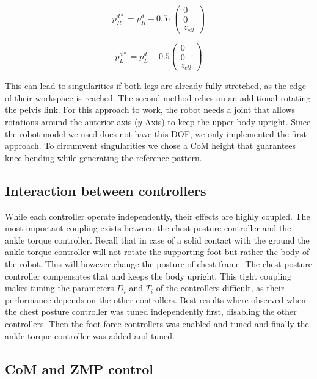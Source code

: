 \documentclass[english,ngerman]{KITreprt}
\begin{document}
\begin{equation}
p^{d*}_R = p^d_R + 0.5 \cdot \left(\begin{array}{c}0 \\ 0 \\ z_{ctl} \end{array}\right)
\end{equation}

\begin{equation}
p^{d*}_L = p^d_L - 0.5 \left(\begin{array}{c}0 \\ 0 \\ z_{ctl} \end{array}\right)
\end{equation}

This can lead to singularities if both legs are already fully stretched,
as the edge of their workspace is reached. The second method relies on
an additional rotating the pelvis link. For this approach to work, the
robot needs a joint that allows rotations around the anterior axis
($y$-Axis) to keep the upper body upright. Since the robot model we used
does not have this DOF, we only implemented the first approach. To
circumvent singularities we chose a CoM height that guarantees knee
bending while generating the reference pattern.

\subsection{Interaction between
controllers}\label{interaction-between-controllers}

While each controller operate independently, their effects are highly
coupled. The most important coupling exists between the chest posture
controller and the ankle torque controller. Recall that in case of a
solid contact with the ground the ankle torque controller will not
rotate the supporting foot but rather the body of the robot. This will
however change the posture of chest frame. The chest posture controller
compensates that and keeps the body upright. This tight coupling makes
tuning the parameters $D_i$ and $T_i$ of the controllers difficult, as
their performance depends on the other controllers. Best results where
observed when the chest posture controller was tuned independently
first, disabling the other controllers. Then the foot force controllers
was enabled and tuned and finally the ankle torque controller was added
and tuned.

\subsection{CoM and ZMP control}\label{com-and-zmp-control}
\end{document}
